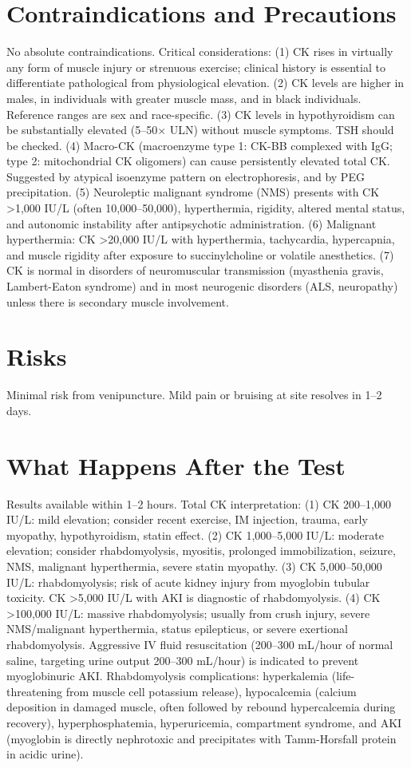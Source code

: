 \section*{Contraindications and Precautions}
No absolute contraindications. Critical considerations: (1) CK rises in virtually any form of muscle injury or strenuous exercise; clinical history is essential to differentiate pathological from physiological elevation. (2) CK levels are higher in males, in individuals with greater muscle mass, and in black individuals. Reference ranges are sex and race-specific. (3) CK levels in hypothyroidism can be substantially elevated (5--50$\times$ ULN) without muscle symptoms. TSH should be checked. (4) Macro-CK (macroenzyme type 1: CK-BB complexed with IgG; type 2: mitochondrial CK oligomers) can cause persistently elevated total CK. Suggested by atypical isoenzyme pattern on electrophoresis, and by PEG precipitation. (5) Neuroleptic malignant syndrome (NMS) presents with CK >1,000 IU/L (often 10,000--50,000), hyperthermia, rigidity, altered mental status, and autonomic instability after antipsychotic administration. (6) Malignant hyperthermia: CK >20,000 IU/L with hyperthermia, tachycardia, hypercapnia, and muscle rigidity after exposure to succinylcholine or volatile anesthetics. (7) CK is normal in disorders of neuromuscular transmission (myasthenia gravis, Lambert-Eaton syndrome) and in most neurogenic disorders (ALS, neuropathy) unless there is secondary muscle involvement.

\section*{Risks}
Minimal risk from venipuncture. Mild pain or bruising at site resolves in 1--2 days.

\section*{What Happens After the Test}
Results available within 1--2 hours. Total CK interpretation: (1) CK 200--1,000 IU/L: mild elevation; consider recent exercise, IM injection, trauma, early myopathy, hypothyroidism, statin effect. (2) CK 1,000--5,000 IU/L: moderate elevation; consider rhabdomyolysis, myositis, prolonged immobilization, seizure, NMS, malignant hyperthermia, severe statin myopathy. (3) CK 5,000--50,000 IU/L: rhabdomyolysis; risk of acute kidney injury from myoglobin tubular toxicity. CK >5,000 IU/L with AKI is diagnostic of rhabdomyolysis. (4) CK >100,000 IU/L: massive rhabdomyolysis; usually from crush injury, severe NMS/malignant hyperthermia, status epilepticus, or severe exertional rhabdomyolysis. Aggressive IV fluid resuscitation (200--300 mL/hour of normal saline, targeting urine output 200--300 mL/hour) is indicated to prevent myoglobinuric AKI. Rhabdomyolysis complications: hyperkalemia (life-threatening from muscle cell potassium release), hypocalcemia (calcium deposition in damaged muscle, often followed by rebound hypercalcemia during recovery), hyperphosphatemia, hyperuricemia, compartment syndrome, and AKI (myoglobin is directly nephrotoxic and precipitates with Tamm-Horsfall protein in acidic urine).

